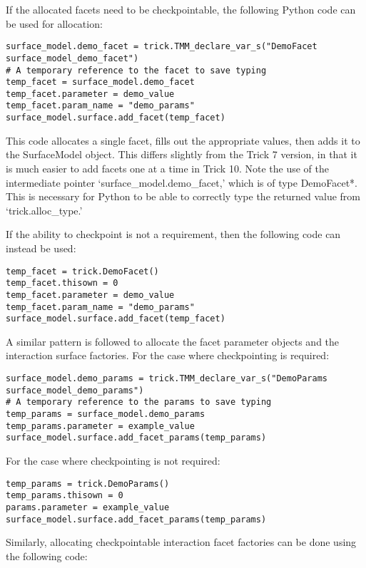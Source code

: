 If the allocated facets need to be checkpointable, the following Python code can be used for allocation:

\begin{verbatim}
surface_model.demo_facet = trick.TMM_declare_var_s("DemoFacet surface_model_demo_facet")
# A temporary reference to the facet to save typing
temp_facet = surface_model.demo_facet
temp_facet.parameter = demo_value
temp_facet.param_name = "demo_params"
surface_model.surface.add_facet(temp_facet)
\end{verbatim}

This code allocates a single facet, fills out
the appropriate values, then adds it to the SurfaceModel
object. This differs slightly from the Trick 7 version, in that
it is much easier to add facets one at a time in Trick 10.
Note the use of the intermediate pointer `surface\_model.demo\_facet,'
which is of type DemoFacet*. This is necessary
for Python to be able to correctly type the returned value from `trick.alloc\_type.'

If the ability to checkpoint is not a requirement, then the following code
can instead be used:

\begin{verbatim}
temp_facet = trick.DemoFacet()
temp_facet.thisown = 0
temp_facet.parameter = demo_value
temp_facet.param_name = "demo_params"
surface_model.surface.add_facet(temp_facet)
\end{verbatim}

A similar pattern is followed to allocate the facet parameter objects and
the interaction surface factories. For the case where checkpointing is required:

\begin{verbatim}
surface_model.demo_params = trick.TMM_declare_var_s("DemoParams surface_model_demo_params")
# A temporary reference to the params to save typing
temp_params = surface_model.demo_params
temp_params.parameter = example_value
surface_model.surface.add_facet_params(temp_params)
\end{verbatim}

For the case where checkpointing is not required:

\begin{verbatim}
temp_params = trick.DemoParams()
temp_params.thisown = 0
params.parameter = example_value
surface_model.surface.add_facet_params(temp_params)
\end{verbatim}

Similarly, allocating checkpointable interaction facet factories can be
done using the following code:

